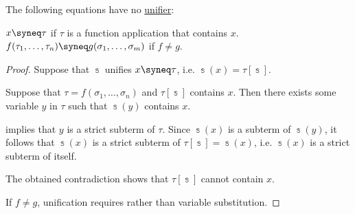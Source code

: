 \begin{lemma}\label{thm:fol_unifier_non_existence}
  The following equations have no \hyperref[def:fol_equation/syntactic_solution]{unifier}:
  \begin{thmenum}
     \( x \syneq \tau \) if \( \tau \) is a function application that contains \( x \).
     \( f(\tau_1, \ldots, \tau_n) \syneq g(\sigma_1, \ldots, \sigma_m) \) if \( f \neq g \).
  \end{thmenum}
\end{lemma}
\begin{proof}
   Suppose that \( \Bbbs \) unifies \( x \syneq \tau \), i.e. \( \Bbbs(x) = \tau[\Bbbs] \).

  Suppose that \( \tau = f(\sigma_1, \ldots, \sigma_n) \) and \( \tau[\Bbbs] \) contains \( x \). Then there exists some variable \( y \) in \( \tau \) such that \( \Bbbs(y) \) contains \( x \).

   implies that \( y \) is a strict subterm of \( \tau \). Since \( \Bbbs(x) \) is a subterm of \( \Bbbs(y) \), it follows that \( \Bbbs(x) \) is a strict subterm of \( \tau[\Bbbs] = \Bbbs(x) \), i.e. \( \Bbbs(x) \) is a strict subterm of itself.

  The obtained contradiction shows that \( \tau[\Bbbs] \) cannot contain \( x \).

   If \( f \neq g \), unification requires  rather than variable substitution.
\end{proof}

